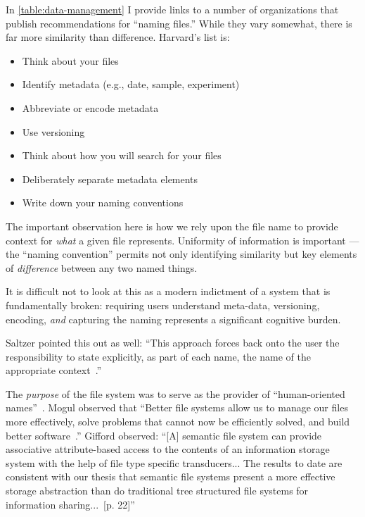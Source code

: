 In \autoref{table:data-management} I provide links to a number of organizations
that publish recommendations for ``naming files.'' While they vary somewhat,
there is far more similarity than difference.  Harvard's list is:

\begin{itemize}
    \item Think about your files
    \item Identify metadata (e.g., date, sample, experiment)
    \item Abbreviate or encode metadata
    \item Use versioning
    \item Think about how you will search for your files
    \item Deliberately separate metadata elements
    \item Write down your naming conventions
\end{itemize}

The important observation here is how we rely upon the file name to provide
context for \emph{what} a given file represents.  Uniformity of information is
important --- the ``naming convention'' permits not only identifying similarity
but key elements of \emph{difference} between any two named things.

It is difficult not to look at this as a modern indictment of a system that is
fundamentally broken: requiring users understand meta-data, versioning,
encoding, \emph{and} capturing the naming represents a significant cognitive
burden.

Saltzer pointed this out as well: ``This approach forces back onto the user the
responsibility to state explicitly, as part of each name, the name of the
appropriate context~\cite{Saltzer1978}.''

The \emph{purpose} of the file system was to serve as the provider of
``human-oriented names''~\cite[Table III]{Saltzer1978}. Mogul observed that
``Better file systems allow us to manage our files more effectively, solve
problems that cannot now be efficiently solved, and build better
software~\cite[p. 1]{mogul1986representing}.''
Gifford observed: ``[A] semantic file system can provide associative
attribute-based access to the contents of an information storage system with the
help of file type specific transducers... The results to date are consistent
with our thesis that semantic file systems present a more effective storage
abstraction than do traditional tree structured file systems for information
sharing...~[p. 22]\cite{gifford1991semantic}''

